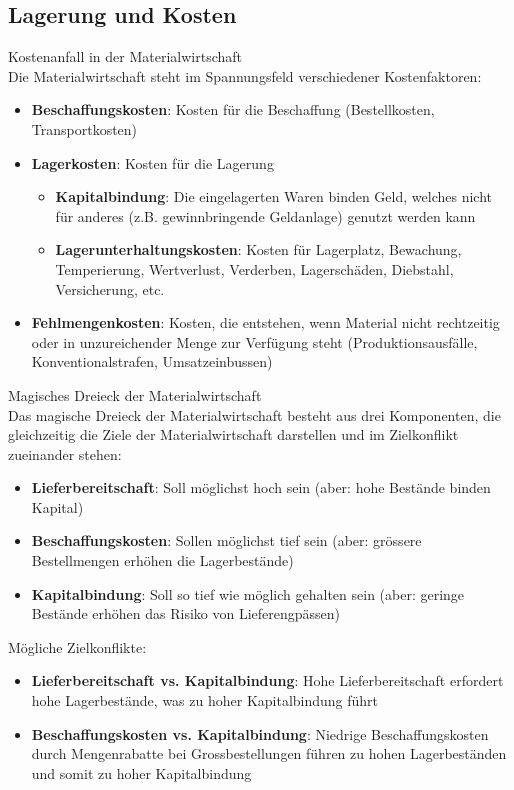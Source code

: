 \subsection{Lagerung und Kosten}

\begin{definition}{Kostenanfall in der Materialwirtschaft}\\
Die Materialwirtschaft steht im Spannungsfeld verschiedener Kostenfaktoren:
\begin{itemize}
    \item \textbf{Beschaffungskosten}: Kosten für die Beschaffung (Bestellkosten, Transportkosten)
    \item \textbf{Lagerkosten}: Kosten für die Lagerung
    \begin{itemize}
        \item \textbf{Kapitalbindung}: Die eingelagerten Waren binden Geld, welches nicht für anderes (z.B. gewinnbringende Geldanlage) genutzt werden kann
        \item \textbf{Lagerunterhaltungskosten}: Kosten für Lagerplatz, Bewachung, Temperierung, Wertverlust, Verderben, Lagerschäden, Diebstahl, Versicherung, etc.
    \end{itemize}
    \item \textbf{Fehlmengenkosten}: Kosten, die entstehen, wenn Material nicht rechtzeitig oder in unzureichender Menge zur Verfügung steht (Produktionsausfälle, Konventionalstrafen, Umsatzeinbussen)
\end{itemize}
\end{definition}

\begin{concept}{Magisches Dreieck der Materialwirtschaft}\\
Das magische Dreieck der Materialwirtschaft besteht aus drei Komponenten, die gleichzeitig die Ziele der Materialwirtschaft darstellen und im Zielkonflikt zueinander stehen:
\begin{itemize}
    \item \textbf{Lieferbereitschaft}: Soll möglichst hoch sein (aber: hohe Bestände binden Kapital)
    \item \textbf{Beschaffungskosten}: Sollen möglichst tief sein (aber: grössere Bestellmengen erhöhen die Lagerbestände)
    \item \textbf{Kapitalbindung}: Soll so tief wie möglich gehalten sein (aber: geringe Bestände erhöhen das Risiko von Lieferengpässen)
\end{itemize}

Mögliche Zielkonflikte:
\begin{itemize}
    \item \textbf{Lieferbereitschaft vs. Kapitalbindung}: Hohe Lieferbereitschaft erfordert hohe Lagerbestände, was zu hoher Kapitalbindung führt
    \item \textbf{Beschaffungskosten vs. Kapitalbindung}: Niedrige Beschaffungskosten durch Mengenrabatte bei Grossbestellungen führen zu hohen Lagerbeständen und somit zu hoher Kapitalbindung
\end{itemize}
\end{concept}

